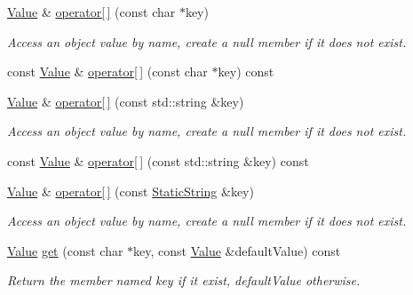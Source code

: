 \begin{DoxyCompactItemize}
\mbox{\hyperlink{class_json_1_1_value}{Value}} \& \mbox{\hyperlink{class_json_1_1_value_aa744825e8edd61f538fa7e718f876dcc}{operator\mbox{[}$\,$\mbox{]}}} (const char $\ast$key)
\begin{DoxyCompactList}\small\item\em Access an object value by name, create a null member if it does not exist. \end{DoxyCompactList}\item 
const \mbox{\hyperlink{class_json_1_1_value}{Value}} \& \mbox{\hyperlink{class_json_1_1_value_a902b8d7b0bbb7a671ea0a5e3a8e936a3}{operator\mbox{[}$\,$\mbox{]}}} (const char $\ast$key) const
\item 
\mbox{\label{class_json_1_1_value_abe307d6088dfa1299729f795259f590e}} 
\mbox{\hyperlink{class_json_1_1_value}{Value}} \& \mbox{\hyperlink{class_json_1_1_value_abe307d6088dfa1299729f795259f590e}{operator\mbox{[}$\,$\mbox{]}}} (const std\+::string \&key)
\begin{DoxyCompactList}\small\item\em Access an object value by name, create a null member if it does not exist. \end{DoxyCompactList}\item 
const \mbox{\hyperlink{class_json_1_1_value}{Value}} \& \mbox{\hyperlink{class_json_1_1_value_a25b2560baf8dd9fd15b120a7f12b0892}{operator\mbox{[}$\,$\mbox{]}}} (const std\+::string \&key) const
\item 
\mbox{\hyperlink{class_json_1_1_value}{Value}} \& \mbox{\hyperlink{class_json_1_1_value_ac191343a7ee2ca54827d67d934200d4f}{operator\mbox{[}$\,$\mbox{]}}} (const \mbox{\hyperlink{class_json_1_1_static_string}{Static\+String}} \&key)
\begin{DoxyCompactList}\small\item\em Access an object value by name, create a null member if it does not exist. \end{DoxyCompactList}\item 
\mbox{\label{class_json_1_1_value_a57de86629ed23246f14014fb6c44fa67}} 
\mbox{\hyperlink{class_json_1_1_value}{Value}} \mbox{\hyperlink{class_json_1_1_value_a57de86629ed23246f14014fb6c44fa67}{get}} (const char $\ast$key, const \mbox{\hyperlink{class_json_1_1_value}{Value}} \&default\+Value) const
\begin{DoxyCompactList}\small\item\em Return the member named key if it exist, default\+Value otherwise. \end{DoxyCompactList}\item 

\end{DoxyCompactItemize}
